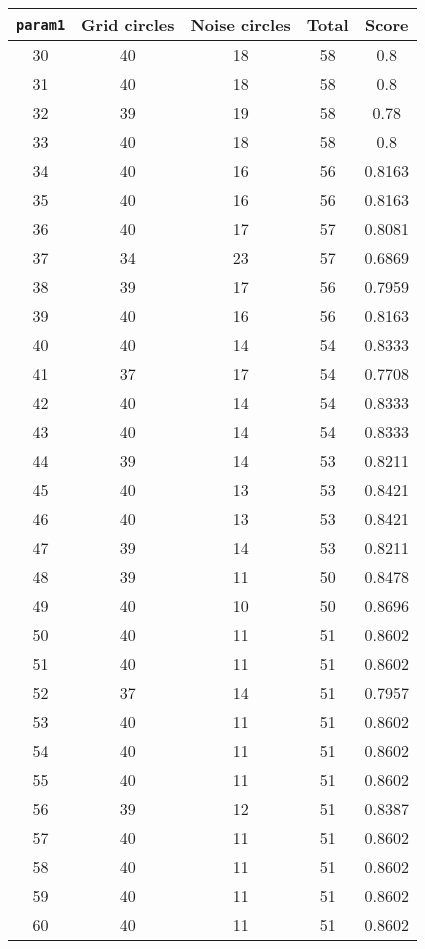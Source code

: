 \documentclass[letterpaper, 12pt]{article}
\begin{document}
\begin{longtable}{|c|c|c|c|c|}
\hline
\textbf{\texttt{param1}} & \textbf{Grid circles} & \textbf{Noise circles} & \textbf{Total} & \textbf{Score} \\
\hline
30 & 40 & 18 & 58 & 0.8 \\
\hline
31 & 40 & 18 & 58 & 0.8 \\
\hline
32 & 39 & 19 & 58 & 0.78 \\
\hline
33 & 40 & 18 & 58 & 0.8 \\
\hline
34 & 40 & 16 & 56 & 0.8163 \\
\hline
35 & 40 & 16 & 56 & 0.8163 \\
\hline
36 & 40 & 17 & 57 & 0.8081 \\
\hline
37 & 34 & 23 & 57 & 0.6869 \\
\hline
38 & 39 & 17 & 56 & 0.7959 \\
\hline
39 & 40 & 16 & 56 & 0.8163 \\
\hline
40 & 40 & 14 & 54 & 0.8333 \\
\hline
41 & 37 & 17 & 54 & 0.7708 \\
\hline
42 & 40 & 14 & 54 & 0.8333 \\
\hline
43 & 40 & 14 & 54 & 0.8333 \\
\hline
44 & 39 & 14 & 53 & 0.8211 \\
\hline
45 & 40 & 13 & 53 & 0.8421 \\
\hline
46 & 40 & 13 & 53 & 0.8421 \\
\hline
47 & 39 & 14 & 53 & 0.8211 \\
\hline
48 & 39 & 11 & 50 & 0.8478 \\
\hline
49 & 40 & 10 & 50 & 0.8696 \\
\hline
50 & 40 & 11 & 51 & 0.8602 \\
\hline
51 & 40 & 11 & 51 & 0.8602 \\
\hline
52 & 37 & 14 & 51 & 0.7957 \\
\hline
53 & 40 & 11 & 51 & 0.8602 \\
\hline
54 & 40 & 11 & 51 & 0.8602 \\
\hline
55 & 40 & 11 & 51 & 0.8602 \\
\hline
56 & 39 & 12 & 51 & 0.8387 \\
\hline
57 & 40 & 11 & 51 & 0.8602 \\
\hline
58 & 40 & 11 & 51 & 0.8602 \\
\hline
59 & 40 & 11 & 51 & 0.8602 \\
\hline
60 & 40 & 11 & 51 & 0.8602 \\

\end{longtable}
\end{document}
